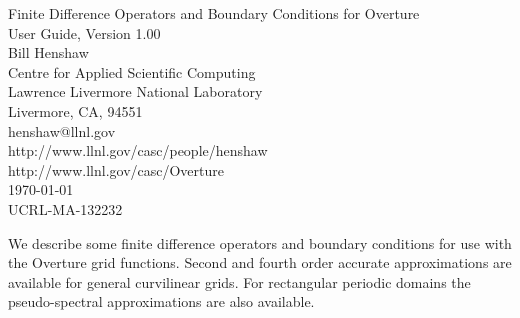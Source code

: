 \documentclass[12pt]{article}
\begin{document}


% 
\def\comma  {~~~,~~}
\def\uvd    {{\bf U}}
\def\ud     {{    U}}
\def\pd     {{    P}}
\def\calo{{\cal O}}

\def\ff {\tt} %

\vspace{5\baselineskip}
\begin{flushleft}
{\Large
Finite Difference Operators and Boundary Conditions for Overture \\
User Guide, Version 1.00 \\
}
\vspace{2\baselineskip}
Bill Henshaw \\
\vspace{\baselineskip}
Centre for Applied Scientific Computing \\
Lawrence Livermore National Laboratory    \\
Livermore, CA, 94551   \\
henshaw@llnl.gov \\
http://www.llnl.gov/casc/people/henshaw \\
http://www.llnl.gov/casc/Overture  \\
\vspace{\baselineskip}
\today \\
\vspace{\baselineskip}
UCRL-MA-132232

\vspace{4\baselineskip}

We describe some finite difference operators and boundary conditions for
use with the Overture grid functions. Second and fourth order accurate
approximations are available for general curvilinear grids. For rectangular
periodic domains the pseudo-spectral approximations are also available.
\end{flushleft}
\end{document}
